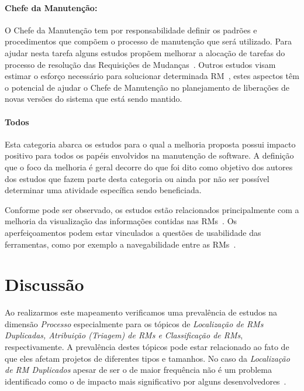 \paragraph{Chefe da Manutenção:}

O Chefe da Manutenção tem por responsabilidade definir os padrões e
procedimentos que compõem o processo de manutenção que será utilizado. Para
ajudar nesta tarefa alguns estudos propõem melhorar a alocação de tarefas do
processo de resolução das Requisições de Mudanças~\cite{netto2010automated}.
Outros estudos visam estimar o esforço necessário para solucionar determinada
RM~\cite{Vijayakumar2014, Nagwani2010}, estes aspectos têm o potencial de ajudar
o Chefe de Manutenção no planejamento de liberações de novas versões do sistema
que está sendo mantido.

\paragraph{Todos} Esta categoria abarca os estudos para o qual a melhoria
proposta possui impacto positivo para todos os papéis envolvidos na manutenção
de software. A definição que o foco da melhoria é geral decorre do que foi dito
como objetivo dos autores dos estudos que fazem parte desta categoria ou ainda
por não ser possível determinar uma atividade específica sendo beneficiada.

Conforme pode ser observado, os estudos estão relacionados principalmente com a
melhoria da  visualização das informações contidas nas RMs~\cite{hora2012bug,
	takama2013application, dal2014bug}. Os aperfeiçoamentos podem estar
vinculados a questões de usabilidade das ferramentas, como por exemplo a
navegabilidade entre as RMs~\cite{dal2014bug}.

\section{Discussão}
\label{sec:discussao}

Ao realizarmos este mapeamento verificamos uma prevalência de estudos na
dimensão \textit{Processo} especialmente para os tópicos de \textit{Localização
	de RMs Duplicadas, Atribuição (Triagem) de RMs e Classificação de RMs},
respectivamente. A prevalência destes tópicos pode estar relacionado ao fato de
que eles afetam projetos de diferentes tipos e tamanhos. No caso da
\textit{Localização de RM Duplicados} apesar de ser o de maior frequência não é
um problema identificado como o de impacto mais significativo por alguns
desenvolvedores~\cite{Bettenburg2008a}.

